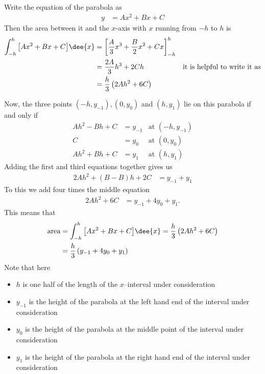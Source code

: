 Write the equation of the parabola as
\begin{align*}
  y &= Ax^2 + Bx +C
\end{align*}
Then the area between it and the $x$-axis with $x$ running from $-h$ to $h$ is
\begin{align*}
  \int_{-h}^h \big[ Ax^2 + Bx +C \big] \dee{x}
  &= \left[ \frac{A}{3}x^3 + \frac{B}{2}x^2 + Cx \right]_{-h}^h \\
  &= \frac{2A}{3}h^3 + 2Ch & \text{it is helpful to write it as}\\
  &= \frac{h}{3}\left( 2Ah^2 + 6C \right)
\end{align*}

Now, the three points $(-h,y_{-1}), (0,y_0)$ and $(h,y_1)$ lie on this parabola if and
only if
\begin{align*}
A h^2 - Bh + C &= y_{-1} & \text{at $(-h,y_{-1})$} \\
C &= y_{0} & \text{at $(0,y_{0})$} \\
A h^2 + Bh + C &= y_{1} & \text{at $(h,y_{1})$}
\end{align*}
Adding the first and third equations together gives us
\begin{align*}
  2Ah^2 + (B-B)h + 2C &= y_{-1}+y_{1}
\end{align*}
To this we add four times the middle equation
\begin{align*}
  2Ah^2 + 6C &= y_{-1}+4y_0+y_1.
\end{align*}
This means that
\begin{align*}
  \text{area} &=  \int_{-h}^h \big[ Ax^2 + Bx +C \big] \dee{x}
  = \frac{h}{3}\left( 2Ah^2 + 6C \right)\\
  &= \frac{h}{3}\left(y_{-1}+4y_0+y_1\right)
\end{align*}
Note that here
\begin{itemize}
\item $h$ is one half of the length of the $x$--interval under consideration
\item $y_{-1}$ is the height of the parabola at the left hand end of the interval under
consideration
\item $y_0$ is the height of the parabola at the middle point of the interval under
consideration
\item $y_{1}$ is the height of the parabola at the right hand end of the interval under
consideration
\end{itemize}


